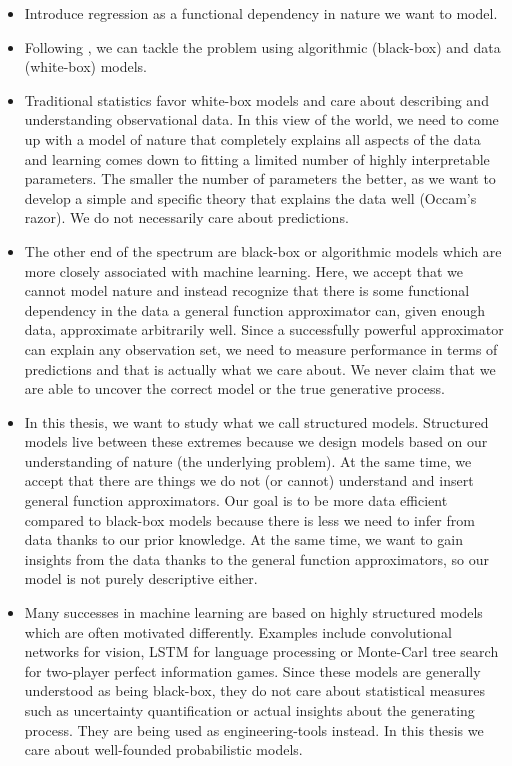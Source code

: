 \begin{itemize}
    \item Introduce regression as a functional dependency in nature we want to model.
    \item Following \textcite{breiman_statistical_2001}, we can tackle the problem using algorithmic (black-box) and data (white-box) models.
    \item Traditional statistics favor white-box models and care about describing and understanding observational data.
          In this view of the world, we need to come up with a model of nature that completely explains all aspects of the data and learning comes down to fitting a limited number of highly interpretable parameters.
          The smaller the number of parameters the better, as we want to develop a simple and specific theory that explains the data well (Occam's razor).
          We do not necessarily care about predictions.
    \item The other end of the spectrum are black-box or algorithmic models which are more closely associated with machine learning.
          Here, we accept that we cannot model nature and instead recognize that there is some functional dependency in the data a general function approximator can, given enough data, approximate arbitrarily well.
          Since a successfully powerful approximator can explain any observation set, we need to measure performance in terms of predictions and that is actually what we care about.
          We never claim that we are able to uncover the correct model or the true generative process.
    \item In this thesis, we want to study what we call structured models.
          Structured models live between these extremes because we design models based on our understanding of nature (the underlying problem).
          At the same time, we accept that there are things we do not (or cannot) understand and insert general function approximators.
          Our goal is to be more data efficient compared to black-box models because there is less we need to infer from data thanks to our prior knowledge.
          At the same time, we want to gain insights from the data thanks to the general function approximators, so our model is not purely descriptive either.
    \item Many successes in machine learning are based on highly structured models which are often motivated differently.
          Examples include convolutional networks for vision, LSTM for language processing or Monte-Carl tree search for two-player perfect information games.
          Since these models are generally understood as being black-box, they do not care about statistical measures such as uncertainty quantification or actual insights about the generating process.
          They are being used as engineering-tools instead.
          In this thesis we care about well-founded probabilistic models.
\end{itemize}


